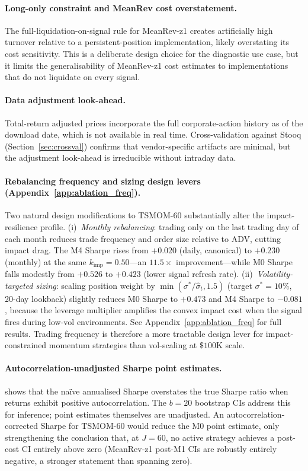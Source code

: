 \documentclass[12pt]{article}
\newcommand{\kimp}{k_{\mathrm{imp}}}
\begin{document}
\paragraph{Long-only constraint and MeanRev cost overstatement.}
The full-liquidation-on-signal rule for MeanRev-z1 creates artificially
high turnover relative to a persistent-position implementation,
likely overstating its cost sensitivity. This is a deliberate design
choice for the diagnostic use case, but it limits the generalisability
of MeanRev-z1 cost estimates to implementations that do not liquidate
on every signal.

\paragraph{Data adjustment look-ahead.}
Total-return adjusted prices incorporate the full corporate-action
history as of the download date, which is not available in real time.
Cross-validation against Stooq (Section~\ref{sec:crossval}) confirms
that vendor-specific artifacts are minimal, but the adjustment
look-ahead is irreducible without intraday data.

\paragraph{Rebalancing frequency and sizing design levers (Appendix~\ref{app:ablation_freq}).}
Two natural design modifications to TSMOM-60 substantially alter the
impact-resilience profile.
(i)~\textit{Monthly rebalancing}: trading only on the last trading day
of each month reduces trade frequency and order size relative to ADV,
cutting impact drag. The M4 Sharpe rises from $+0.020$ (daily,
canonical) to $+0.230$ (monthly) at the same $\kimp = 0.50$---an
$11.5\times$ improvement---while M0 Sharpe falls modestly from $+0.526$
to $+0.423$ (lower signal refresh rate).
(ii)~\textit{Volatility-targeted sizing}: scaling position weight by
$\min(\sigma^*/\hat\sigma_t, 1.5)$ (target $\sigma^* = 10\%$, 20-day
lookback) slightly reduces M0 Sharpe to $+0.473$ and M4 Sharpe to $-0.081$,
because the leverage multiplier amplifies the convex impact cost when the
signal fires during low-vol environments. See Appendix~\ref{app:ablation_freq}
for full results. Trading frequency is therefore a more tractable design
lever for impact-constrained momentum strategies than vol-scaling at
$\$100$K scale.

\paragraph{Autocorrelation-unadjusted Sharpe point estimates.}
\citet{lo2002statistics} shows that the na\"{i}ve annualised Sharpe
overstates the true Sharpe ratio when returns exhibit positive
autocorrelation. The $b = 20$ bootstrap CIs address this for inference;
point estimates themselves are unadjusted. An autocorrelation-corrected
Sharpe for TSMOM-60 would reduce the M0 point estimate, only
strengthening the conclusion that, at $J=60$, no active strategy
achieves a post-cost CI entirely above zero (MeanRev-z1 post-M1 CIs
are robustly entirely negative, a stronger statement than spanning
zero).
\end{document}
